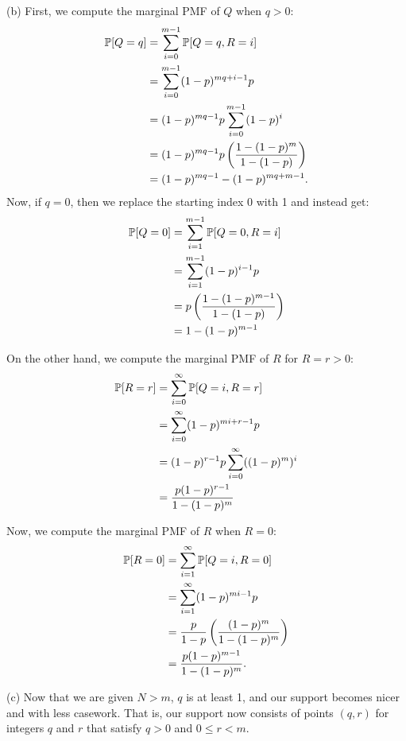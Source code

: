 \begin{enumerate}
    (b) First, we compute the marginal PMF of $Q$ when $q > 0$:
    \begin{align*}
        \P[Q = q] &= \sum\limits_{i = 0}^{m - 1}\P[Q = q, R = i] \\
            &= \sum\limits_{i = 0}^{m - 1}(1 - p)^{mq + i - 1}p \\
            &= (1 - p)^{mq - 1}p\sum\limits_{i = 0}^{m - 1}(1 - p)^i \\
            &= (1 - p)^{mq - 1}p\left(\frac{1 - (1 - p)^m}{1 - (1 - p)}\right) \\
            &= (1 - p)^{mq - 1} - (1 - p)^{mq + m - 1}.
    \end{align*}
    Now, if $q = 0$, then we replace the starting index 0 with 1 and instead get:
    \begin{align*}
        \P[Q = 0] &= \sum\limits_{i = 1}^{m - 1}\P[Q = 0, R = i] \\
            &= \sum\limits_{i = 1}^{m - 1}(1 - p)^{i - 1}p \\
            &=p\left(\frac{1 - (1 - p)^{m - 1}}{1 - (1 - p)}\right) \\
            &= 1 - (1 - p)^{m - 1}
    \end{align*}
    
    On the other hand, we compute the marginal PMF of $R$ for $R = r > 0$:
    \begin{align*}
        \P[R = r] &= \sum\limits_{i = 0}^\infty \P[Q = i, R = r] \\
            &= \sum\limits_{i = 0}^\infty(1 - p)^{mi + r - 1}p \\ 
            &= (1 - p)^{r - 1}p\sum\limits_{i = 0}^\infty((1 - p)^m)^i \\
            &= \frac{p(1 - p)^{r - 1}}{1 - (1 - p)^m}
    \end{align*}
    
    Now, we compute the marginal PMF of $R$ when $R = 0$:
    \begin{align*}
        \P[R = 0] &= \sum\limits_{i = 1}^\infty \P[Q = i, R = 0] \\
            &= \sum\limits_{i = 1}^\infty(1 - p)^{mi - 1}p \\
            &= \frac{p}{1 - p}\left(\frac{(1 - p)^m}{1 - (1 - p)^m}\right) \\
            &= \frac{p(1 - p)^{m - 1}}{1 - (1 - p)^m}.
    \end{align*}
    
    (c) Now that we are given $N > m$, $q$ is at least 1, and our support becomes nicer and with less casework. That is, our support now consists of points $(q, r)$ for integers $q$ and $r$ that satisfy $q > 0$ and $0 \leq r < m$.
    

\end{enumerate}
